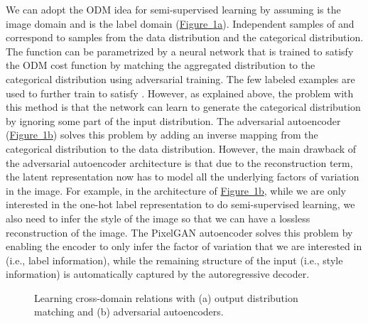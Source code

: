 \documentclass{article}
\newcommand{\myfigg}[2]{\hyperref[fig:#1]{Figure~\ref*{fig:#1}#2}}
\begin{document}
We can adopt the ODM idea for semi-supervised learning by assuming  is the image domain and  is the label domain (\myfigg{related}{a}). Independent samples of  and  correspond to samples from the data distribution  and the categorical distribution. The function  can be parametrized by a neural network that is trained to satisfy the ODM cost function by matching the aggregated distribution  to the categorical distribution using adversarial training. The few labeled examples are used to further train  to satisfy . However, as explained above, the problem with this method is that the network can learn to generate the categorical distribution by ignoring some part of the input distribution. The adversarial autoencoder (\myfigg{related}{b}) solves this problem by adding an inverse mapping from the categorical distribution to the data distribution. However, the main drawback of the adversarial autoencoder architecture is that due to the reconstruction term, the latent representation now has to model all the underlying factors of variation in the image. For example, in the architecture of \myfigg{related}{b}, while we are only interested in the one-hot label representation to do semi-supervised learning, we also need to infer the style of the image so that we can have a lossless reconstruction of the image. The PixelGAN autoencoder solves this problem by enabling the encoder to only infer the factor of variation that we are interested in (i.e., label information), while the remaining structure of the input (i.e., style information) is automatically captured by the autoregressive decoder.

\begin{figure}[t]
\centering
{}
\hspace{1.5cm}
\vspace{-.3cm}
\caption{\label{fig:related}Learning cross-domain relations with (a) output distribution matching and (b) adversarial autoencoders.}
\end{figure}
\end{document}
